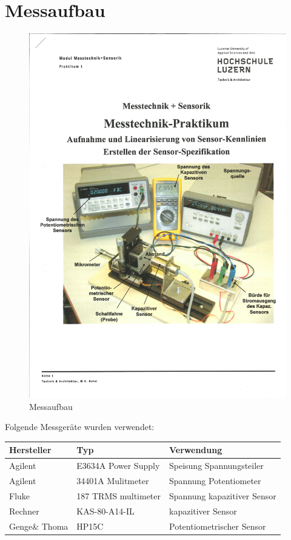 \section{Messaufbau}


\begin{figure}[H]
    \centering
    \includegraphics[scale=0.8,trim={0.5cm 6cm 0 10.5cm},clip]{pic/aufbau.pdf}
    \caption{Messaufbau}
    \label{fig:messaufbau}
\end{figure}

Folgende Messgeräte wurden verwendet: \\

\begin{tabular}{ l | l | l}
    \hline
    Hersteller & Typ                 & Verwendung                  \\ \hline
    Agilent    & E3634A Power Supply & Speisung Spannungsteiler    \\ \hline
    Agilent    & 34401A Mulitmeter   & Spannung Potentiometer      \\ \hline
    Fluke      & 187 TRMS multimeter & Spannung kapazitiver Sensor \\ \hline
    Rechner    & KAS-80-A14-IL       & kapazitiver Sensor          \\ \hline
    Genge\& Thoma & HP15C               & Potentiometrischer Sensor   \\ \hline
\end{tabular}








\clearpage